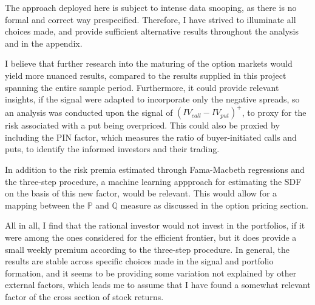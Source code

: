 The approach deployed here is subject to intense data snooping, as there is no formal and correct way prespecified. Therefore, I have strived to illuminate all choices made, and provide sufficient alternative results throughout the analysis and in the appendix.

I believe that further research into the maturing of the option markets would yield more nuanced results, compared to the results supplied in this project spanning the entire sample period. Furthermore, it could provide relevant insights, if the signal were adapted to incorporate only the negative spreads, so an analysis was conducted upon the signal of $\left(IV_{call}-IV_{put}\right)^{+}$, to proxy for the risk associated with a put being overpriced. This could also be proxied by including the PIN factor, which measures the ratio of buyer-initiated calls and puts, to identify the informed investors and their trading.

In addition to the risk premia estimated through Fama-Macbeth regressions and the three-step procedure, a machine learning appproach for estimating the SDF on the basis of this new factor, would be relevant. This would allow for a mapping between the $\mathbb{P}$ and $\mathbb{Q}$ measure as discussed in the option pricing section.

All in all, I find that the rational investor would not invest in the portfolios, if it were among the ones considered for the efficient frontier, but it does provide a small weekly premium according to the three-step procedure. In general, the results are stable across specific choices made in the signal and portfolio formation, and it seems to be providing some variation not explained by other external factors, which leads me to assume that I have found a somewhat relevant factor of the cross section of stock returns.
